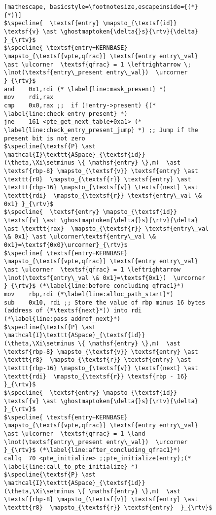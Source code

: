 \begin{figure}
\begin{lstlisting}[mathescape, basicstyle=\footnotesize,escapeinside={(*}{*)}]
$\specline{  \textsf{entry} \mapsto_{\textsf{id}} \textsf{v} \ast \ghostmaptoken{\delta{}s}{\rtv}{\delta}  }_{\rtv}$
$\specline{ \textsf{entry+KERNBASE} \mapsto_{\textsf{vpte,qfrac}} \textsf{entry entry\_val} \ast \ulcorner  \textsf{qfrac} = 1 \leftrightarrow \; \lnot(\textsf{entry\_present entry\_val})  \urcorner }_{\rtv}$
and    0x1,rdi (* \label{line:mask_present} *)
mov    rdi,rax
cmp    0x0,rax ;;  if (!entry->present) {(* \label{line:check_entry_present} *)
jne    161 <pte_get_next_table+0xa1> (* \label{line:check_entry_present_jump} *) ;; Jump if the present bit is not zero
$\specline{\textsf{P} \ast \mathcal{I}\texttt{ASpace}_{\textsf{id}}(\theta,\Xi\setminus \{ \mathsf{entry} \},m)  \ast \textsf{rbp-8} \mapsto_{\textsf{v}} \textsf{entry} \ast \texttt{r8}  \mapsto_{\textsf{r}} \textsf{entry} \ast \texttt{rbp-16} \mapsto_{\textsf{v}} \textsf{next} \ast \texttt{rdi}  \mapsto_{\textsf{r}} \textsf{entry\_val \& 0x1} }_{\rtv}$
$\specline{  \textsf{entry} \mapsto_{\textsf{id}} \textsf{v} \ast \ghostmaptoken{\delta{}s}{\rtv}{\delta}  \ast \texttt{rax}  \mapsto_{\textsf{r}} \textsf{entry\_val \& 0x1} \ast \ulcorner\textsf{entry\_val \& 0x1}=\textsf{0x0}\urcorner}_{\rtv}$
$\specline{ \textsf{entry+KERNBASE} \mapsto_{\textsf{vpte,qfrac}} \textsf{entry entry\_val} \ast \ulcorner  \textsf{qfrac} = 1 \leftrightarrow  \lnot(\textsf{entry\_val \& 0x1}=\textsf{0x1})  \urcorner }_{\rtv}$ (*\label{line:before_concluding_qfrac1}*)
mov    rbp,rdi (*\label{line:alloc_path_start}*)
sub    0x10, rdi ;; Store the value of rbp minus 16 bytes (address of (*\textsf{next}*)) into rdi (*\label{line:pass_addrof_next}*)
$\specline{\textsf{P} \ast \mathcal{I}\texttt{ASpace}_{\textsf{id}}(\theta,\Xi\setminus \{ \mathsf{entry} \},m)  \ast \textsf{rbp-8} \mapsto_{\textsf{v}} \textsf{entry} \ast \texttt{r8}  \mapsto_{\textsf{r}} \textsf{entry} \ast \texttt{rbp-16} \mapsto_{\textsf{v}} \textsf{next} \ast \texttt{rdi}  \mapsto_{\textsf{r}} \textsf{rbp - 16} }_{\rtv}$
$\specline{  \textsf{entry} \mapsto_{\textsf{id}} \textsf{v} \ast \ghostmaptoken{\delta{}s}{\rtv}{\delta} }_{\rtv}$
$\specline{ \textsf{entry+KERNBASE} \mapsto_{\textsf{vpte,qfrac}} \textsf{entry entry\_val} \ast \ulcorner  \textsf{qfrac} = 1 \land \lnot(\textsf{entry\_present entry\_val})  \urcorner }_{\rtv}$ (*\label{line:after_concluding_qfrac1}*)
callq  70 <pte_initialize> ;;pte_initialize(entry);(* \label{line:call_to_pte_initialize} *)
$\specline{\textsf{P} \ast \mathcal{I}\texttt{ASpace}_{\textsf{id}}(\theta,\Xi\setminus \{ \mathsf{entry} \},m)  \ast \textsf{rbp-8} \mapsto_{\textsf{v}} \textsf{entry} \ast \texttt{r8}  \mapsto_{\textsf{r}} \textsf{entry}  }_{\rtv}$

\end{lstlisting}
\end{figure}
